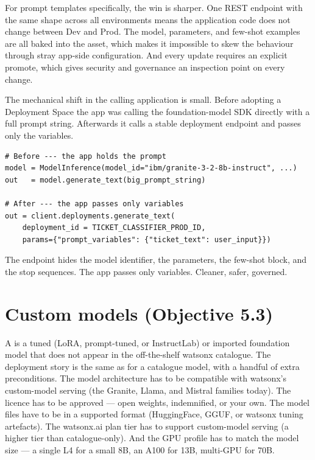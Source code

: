 For prompt templates specifically, the win is sharper. One REST endpoint with the same shape across all environments means the application code does not change between Dev and Prod. The model, parameters, and few-shot examples are all baked into the asset, which makes it impossible to skew the behaviour through stray app-side configuration. And every update requires an explicit promote, which gives security and governance an inspection point on every change.

The mechanical shift in the calling application is small. Before adopting a Deployment Space the app was calling the foundation-model SDK directly with a full prompt string. Afterwards it calls a stable deployment endpoint and passes only the variables.

\begin{lstlisting}[style=pythonstyle]
# Before --- the app holds the prompt
model = ModelInference(model_id="ibm/granite-3-2-8b-instruct", ...)
out   = model.generate_text(big_prompt_string)

# After --- the app passes only variables
out = client.deployments.generate_text(
    deployment_id = TICKET_CLASSIFIER_PROD_ID,
    params={"prompt_variables": {"ticket_text": user_input}})
\end{lstlisting}

The endpoint hides the model identifier, the parameters, the few-shot block, and the stop sequences. The app passes only variables. Cleaner, safer, governed.

\section{Custom models (Objective 5.3)}

A  is a tuned (LoRA, prompt-tuned, or InstructLab) or imported foundation model that does not appear in the off-the-shelf watsonx catalogue. The deployment story is the same as for a catalogue model, with a handful of extra preconditions. The model architecture has to be compatible with watsonx's custom-model serving (the Granite, Llama, and Mistral families today). The licence has to be approved --- open weights, indemnified, or your own. The model files have to be in a supported format (HuggingFace, GGUF, or watsonx tuning artefacts). The watsonx.ai plan tier has to support custom-model serving (a higher tier than catalogue-only). And the GPU profile has to match the model size --- a single L4 for a small 8B, an A100 for 13B, multi-GPU for 70B.

